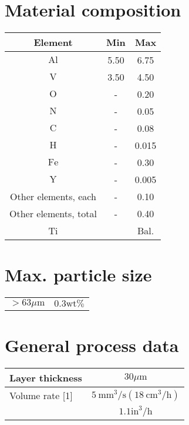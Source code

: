 \documentclass[10pt]{article}
\begin{document}
\section*{Material composition}
\begin{center}
\begin{tabular}{ccc}
Element & Min & Max \\
\hline
$\mathrm{Al}$ & 5.50 & 6.75 \\
\hline
$\mathrm{V}$ & 3.50 & 4.50 \\
\hline
$\mathrm{O}$ & - & 0.20 \\
\hline
$\mathrm{N}$ & - & 0.05 \\
\hline
$\mathrm{C}$ & - & 0.08 \\
\hline
$\mathrm{H}$ & - & 0.015 \\
\hline
$\mathrm{Fe}$ & - & 0.30 \\
\hline
$\mathrm{Y}$ & - & 0.005 \\
\hline
Other elements, each & - & 0.10 \\
\hline
Other elements, total & - & 0.40 \\
\hline
Ti &  & Bal. \\
\hline
\end{tabular}
\end{center}

\section*{Max. particle size}
\begin{center}
\begin{tabular}{ll}
$>63 \mu \mathrm{m}$ & $0.3 \mathrm{wt} \%$ \\
\end{tabular}
\end{center}

\section*{General process data}
\begin{center}
\begin{tabular}{lc}
\hline
Layer thickness & $30 \mu \mathrm{m}$ \\
\hline
Volume rate [1] & $5 \mathrm{~mm}^{3} / \mathrm{s}\left(18 \mathrm{~cm}^{3} / \mathrm{h}\right)$ \\
 & $1.1 \mathrm{in}^{3} / \mathrm{h}$ \\
\end{tabular}
\end{center}
\end{document}
